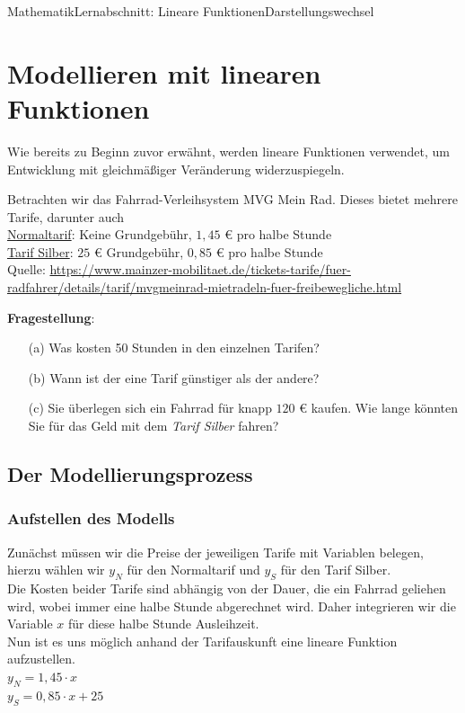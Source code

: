 \documentclass[11pt,twocolumn,oneside,openany,headings=optiontotoc,11pt,numbers=noenddot]{article}
\begin{document}
\begin{worksheet}{Mathematik}{Lernabschnitt: Lineare Funktionen}{Darstellungswechsel}
		\section{Modellieren mit linearen Funktionen}
		Wie bereits zu Beginn zuvor erwähnt, werden lineare Funktionen verwendet, um Entwicklung mit gleichmäßiger Veränderung widerzuspiegeln.\\
		\par\noindent
		Betrachten wir das Fahrrad-Verleihsystem \glqq{}MVG Mein Rad\grqq{}. Dieses bietet mehrere Tarife, darunter auch\\
		\underline{Normaltarif}: Keine Grundgebühr, \(1,45\) \euro{} pro halbe Stunde\\
		\underline{Tarif Silber}: \(25\) \euro{} Grundgebühr, \(0,85\) \euro{} pro halbe Stunde\\
		\tiny{Quelle: \url{https://www.mainzer-mobilitaet.de/tickets-tarife/fuer-radfahrer/details/tarif/mvgmeinrad-mietradeln-fuer-freibewegliche.html}}\\
		\normalsize
		\par\noindent
		\textbf{Fragestellung}:
		\begin{itemize}
			\item[(a)] Was kosten 50 Stunden in den einzelnen Tarifen?
			\item[(b)] Wann ist der eine Tarif günstiger als der andere?
			\item[(c)] Sie überlegen sich ein Fahrrad für knapp \(120\) \euro{} kaufen. Wie lange könnten Sie für das Geld mit dem \textit{Tarif Silber} fahren?
		\end{itemize}
		\subsection{Der Modellierungsprozess}
		\subsubsection{Aufstellen des Modells}
		Zunächst müssen wir die Preise der jeweiligen Tarife mit Variablen belegen, hierzu wählen wir \(y_N\) für den Normaltarif und \(y_S\) für den Tarif Silber.\\
		Die Kosten beider Tarife sind abhängig von der Dauer, die ein Fahrrad geliehen wird, wobei immer eine halbe Stunde abgerechnet wird. Daher integrieren wir die Variable \(x\) für diese halbe Stunde Ausleihzeit.\\
		Nun ist es uns möglich anhand der Tarifauskunft eine lineare Funktion aufzustellen.\\
		\(y_N = 1,45\cdot{}x\)\\
		\(y_S = 0,85\cdot{}x + 25\)\\

\end{worksheet}
\end{document}
